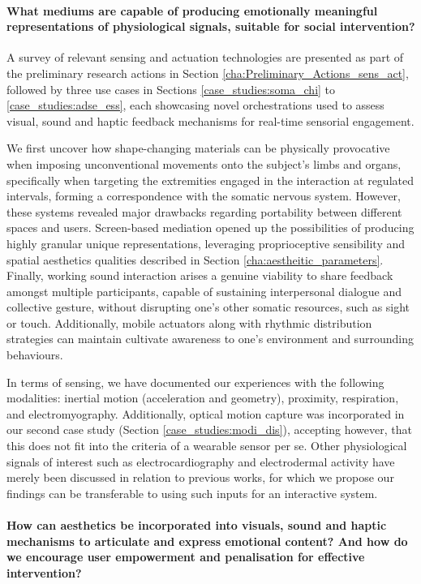 \paragraph{What mediums are capable of producing emotionally meaningful representations of physiological signals, suitable for social intervention?}

A survey of relevant sensing and actuation technologies are presented as part of the preliminary research actions in Section \ref{cha:Preliminary_Actions_sens_act}, followed by three use cases in Sections \ref{case_studies:soma_chi} to \ref{case_studies:adse_ess}, each showcasing novel orchestrations used to assess visual, sound and haptic feedback mechanisms for real-time sensorial engagement. 

We first uncover how shape-changing materials can be physically provocative when imposing unconventional movements onto the subject's limbs and organs, specifically when targeting the extremities engaged in the interaction at regulated intervals, forming a correspondence with the somatic nervous system. However, these systems revealed major drawbacks regarding portability between different spaces and users. Screen-based mediation opened up the possibilities of producing highly granular unique representations, leveraging proprioceptive sensibility and spatial aesthetics qualities described in Section \ref{cha:aestheitic_parameters}. Finally, working sound interaction arises a genuine viability to share feedback amongst multiple participants, capable of sustaining interpersonal dialogue and collective gesture, without disrupting one's other somatic resources, such as sight or touch. Additionally, mobile actuators along with rhythmic distribution strategies can maintain cultivate awareness to one's environment and surrounding behaviours. 

In terms of sensing, we have documented our experiences with the following modalities: inertial motion (acceleration and geometry), proximity, respiration, and electromyography. Additionally, optical motion capture was incorporated in our second case study (Section \ref{case_studies:modi_dis}), accepting however, that this does not fit into the criteria of a wearable sensor per se. Other physiological signals of interest such as electrocardiography and electrodermal activity have merely been discussed in relation to previous works, for which we propose our findings can be transferable to using such inputs for an interactive system.

\paragraph{How can aesthetics be incorporated into visuals, sound and haptic mechanisms to articulate and express emotional content? And how do we encourage user empowerment and penalisation for effective intervention?}
    
